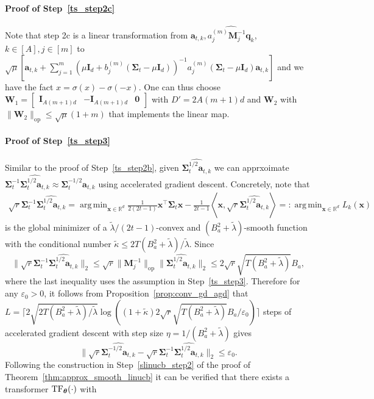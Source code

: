\documentclass[10pt]{article}
\newcommand{\id}{\bI}
\newcommand{\eps}{\varepsilon}
\DeclareMathOperator*{\argmin}{arg\,min}
\newcommand{\lops}[1]{\|{#1}\|_{\mathrm{op}}}
\newcommand{\<}{\left\langle}
\renewcommand{\>}{\right\rangle}
\newcommand{\TF}{{\rm TF}}
\newcommand{\bzero}{{\mathbf 0}}
\newcommand{\R}{\mathbb{R}}
\newcommand{\Tpscov}{{{\mathbf\Sigma}}}
\newcommand{\Tpsparn}{{r}}
\newcommand{\prodeig}{{\mu}}
\newcommand{\padecond}{{\tilde \kappa}}
\newcommand{\intvec}{{\mathbf {q}}}
\newcommand{\intmat}{{\mathbf {M}}}
\newcommand{\hidden}{{D'}}
\def\bI{{\mathbf I}}
\def\bW{{\mathbf W}}
\def\btheta{{\boldsymbol \theta}}
\def\ba{{\mathbf a}}
\def\bx{{\mathbf x}}
\begin{document}
\paragraph{Proof of Step~\ref{ts_step2c}}
Note that step 2c is a linear transformation from $\ba_{t,k},\widehat{a_j^{(m)}\intmat_j^{-1}\intvec_k}$, $k\in[A],j\in[m]$ to  $\sqrt{\prodeig} [\ba_{t,k}+\sum_{j=1}^m ({\prodeig}\id_d+{b_j^{(m)}(\Tpscov_t-\prodeig \id_d)})^{-1}{a_j^{(m)}(\Tpscov_t-\prodeig \id_d)\ba_{t,k}} ]$ and we have the fact $x=\sigma(x)-\sigma(-x)$. One can thus choose $\bW_1=\begin{bmatrix}
    \id_{A(m+1)d} & -\id_{A(m+1)d}&\bzero
\end{bmatrix}$ with $\hidden=2A(m+1)d$ and $\bW_2$ with $\lops{\bW_2}\leq \sqrt{\prodeig}(1+m)$ that implements the linear map.
\paragraph{Proof of Step~\ref{ts_step3}}
Similar to the proof of Step~\ref{ts_step2b}, given $\widehat{\Tpscov_t^{1/2}\ba_{t,k}}$ we can apprxoimate $\Tpscov_t^{-1}\widehat{\Tpscov_t^{1/2}\ba_{t,k}}\approx \Tpscov_t^{-1/2}\ba_{t,k}$ using accelerated gradient descent. Concretely, note that
\begin{align*}
   \sqrt{\Tpsparn}\Tpscov_t^{-1}\widehat{\Tpscov_t^{1/2}\ba_{t,k}} =\argmin_{\bx\in\R^d}\frac{1}{2(2t-1)}\bx^\top\Tpscov_t\bx-\frac{1}{2t-1}\<\bx,  \sqrt{\Tpsparn}\widehat{\Tpscov_t^{1/2}\ba_{t,k}}\>=:\argmin_{\bx\in\R^d} L_{k}(\bx)
\end{align*}
is the global minimizer of a $\tilde\lambda/(2t-1)$-convex and $(B_a^2+\tilde\lambda)$-smooth function with the conditional number $\padecond\leq 2T(B_a^2+\tilde\lambda)/\tilde\lambda$. Since
$$
\|\sqrt{\Tpsparn}\Tpscov_t^{-1}\widehat{\Tpscov_t^{1/2}\ba_{t,k}} \|_2\leq\sqrt{\Tpsparn}\lops{\intmat_j^{-1}}\|\widehat{\Tpscov_t^{1/2}\ba_{t,k}} \|_2\leq 2\sqrt{\Tpsparn}\sqrt{T(B_a^2+\tilde\lambda)}B_a,$$
where the last inequality uses the assumption in Step~\ref{ts_step3}.
Therefore for any $\eps_0>0$, it follows from Proposition~\ref{prop:conv_gd_agd} that
$L=\lceil2\sqrt{2 T(B_a^2+\tilde\lambda)/\tilde\lambda}\log((1+\padecond)2\sqrt{\Tpsparn}\sqrt{T(B_a^2+\tilde\lambda)}B_a/\eps_0)\rceil$ steps of accelerated gradient descent with step size $\eta=1/(B_a^2+\tilde\lambda)$ gives  $$\|\sqrt{\Tpsparn}\widehat{\Tpscov_t^{-1/2}\ba_{t,k}} -\sqrt{\Tpsparn}\Tpscov_t^{-1}\widehat{\Tpscov_t^{1/2}\ba_{t,k}} \|_2\leq\eps_0.$$
Following the construction in Step~\ref{slinucb_step2} of the proof of Theorem~\ref{thm:approx_smooth_linucb} it can be verified that there exists a transformer $\TF_\btheta(\cdot)$ with
\end{document}
